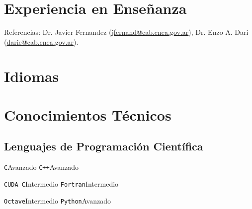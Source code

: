 \documentclass[11pt,a4paper,sans]{moderncv}        %
\begin{document}

\section{Experiencia en Enseñanza}

{Referencias: Dr. Javier Fernandez (\href{mailto:jfernand@cab.cnea.gov.ar}{jfernand@cab.cnea.gov.ar}), Dr. Enzo A. Dari (\href{mailto:darie@cab.cnea.gov.ar}{darie@cab.cnea.gov.ar}).}

\section{Idiomas}



\section{Conocimientos Técnicos}

\subsection{Lenguajes de Programación Científica}

\cvdoubleitem
{\texttt{C}}{Avanzado}
{\texttt{C++}}{Avanzado}

\cvdoubleitem
{\texttt{CUDA C}}{Intermedio}
{\texttt{Fortran}}{Intermedio}

\cvdoubleitem
{\texttt{Octave}}{Intermedio} 
{\texttt{Python}}{Avanzado}
\end{document}
